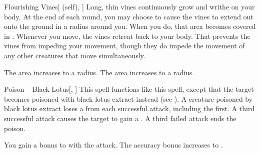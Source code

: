 \lowercase{\hypertarget{spell:Flourishing Vines}{}}\label{spell:Flourishing Vines}
\begin{attuneability}[Rank 4]{\hypertarget{spell:Flourishing Vines}{Flourishing Vines}}[ (self), ]
Long, thin vines continuously grow and writhe on your body.
At the end of each round, you may choose to cause the vines to extend out onto the ground in a \areamed radius around you.
When you do, that area becomes covered in .
Whenever you move, the vines retreat back to your body.
That prevents the vines from impeding your movement, though they do impede the movement of any other creatures that move simultaneously.

\rankline
{} The area increases to a \arealarge radius.
 The area increases to a \areahuge radius.

\end{attuneability}
\vspace{0.25em}



\lowercase{\hypertarget{spell:Poison -- Black Lotus}{}}\label{spell:Poison -- Black Lotus}
\begin{freeability}[Rank 4]{\hypertarget{spell:Poison -- Black Lotus}{Poison -- Black Lotus}}[, ]
This spell functions like this  spell, except that the target becomes poisoned with black lotus extract instead (see ).
A creature poisoned by black lotus extract loses a  from each successful attack, including the first.
A third successful attack causes the target to gain a .
A third failed attack ends the poison.

\rankline
{} You gain a  bonus to  with the attack.
 The accuracy bonus increases to .

\end{freeability}
\vspace{0.25em}




